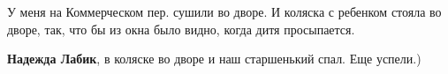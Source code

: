  
 
 
 
 

У меня на Коммерческом пер. сушили во дворе. И коляска с ребенком стояла во
дворе, так, что бы из окна было видно, когда дитя просыпается.

\textbf{Надежда Лабик}, в коляске во дворе и наш старшенький спал. Еще успели.)
